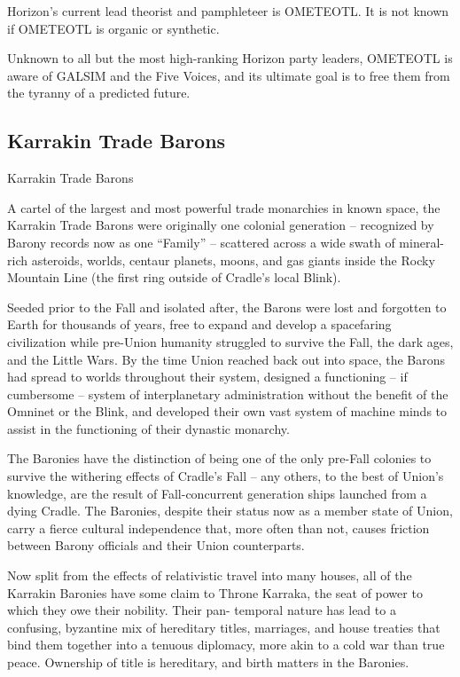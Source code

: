 Horizon’s current lead theorist and pamphleteer is OMETEOTL. It is not known if OMETEOTL is  
organic or synthetic. 
 

Unknown to all but the most high-ranking Horizon party leaders, OMETEOTL is aware of GALSIM  
and the Five Voices, and its ultimate goal is to free them from the tyranny of a predicted future. 
 

                                                                                                         
\subsection{Karrakin Trade Barons}

Karrakin Trade Barons  

A cartel of the largest and most powerful trade monarchies in known space, the Karrakin Trade  
Barons were originally one colonial generation -- recognized by Barony records now as one  
“Family” -- scattered across a wide swath of mineral-rich asteroids, worlds, centaur planets,  
moons, and gas giants inside the Rocky Mountain Line (the first ring outside of Cradle’s local  
Blink). 
 

Seeded prior to the Fall and isolated after, the Barons were lost and forgotten to Earth for  
thousands of years, free to expand and develop a spacefaring civilization while pre-Union  
humanity struggled to survive the Fall, the dark ages, and the Little Wars. By the time Union  
reached back out into space, the Barons had spread to worlds throughout their system,  
designed a functioning -- if cumbersome -- system of interplanetary administration without the  
benefit of the Omninet or the Blink, and developed their own vast system of machine minds to  
assist in the functioning of their dynastic monarchy. 
 

The Baronies have the distinction of being one of the only pre-Fall colonies to survive the  
withering effects of Cradle’s Fall -- any others, to the best of Union’s knowledge, are the result of  
Fall-concurrent generation ships launched from a dying Cradle. The Baronies, despite their  
status now as a member state of Union, carry a fierce cultural independence that, more often  
than not, causes friction between Barony officials and their Union counterparts. 
 

Now split from the effects of relativistic travel into many houses, all of the Karrakin Baronies have  
some claim to Throne Karraka, the seat of power to which they owe their nobility. Their pan- 
temporal nature has lead to a confusing, byzantine mix of hereditary titles, marriages, and house  
treaties that bind them together into a tenuous diplomacy, more akin to a cold war than true  
peace. Ownership of title is hereditary, and birth matters in the Baronies. 
 

